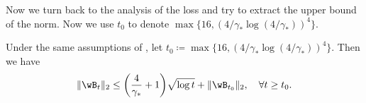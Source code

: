 Now we turn back to the analysis of the loss and try to extract the upper bound of the norm. Now we use $t_0$ to denote 
$ \max \{ 16 , ( 4/ \gamma_* \log (4 / \gamma_* ))^4  \}$. 


\begin{lemma}
\label{lem: Parameter norm upper bound}
Under the same assumptions of , let $t_0 \coloneqq \max \{ 16 , ( 4/ \gamma_* \log (4 / \gamma_* ))^4  \}$. Then we have  
\begin{equation}
\label{eq: parameter norm upper bound}
    \|\wB_t \|_2 \le  \bigg(\frac{4}{\gamma_*}+1 \bigg) \sqrt{\log t} + \|\wB_{t_0}\|_2, \quad \forall t\ge t_0. 
\end{equation}
\end{lemma}

